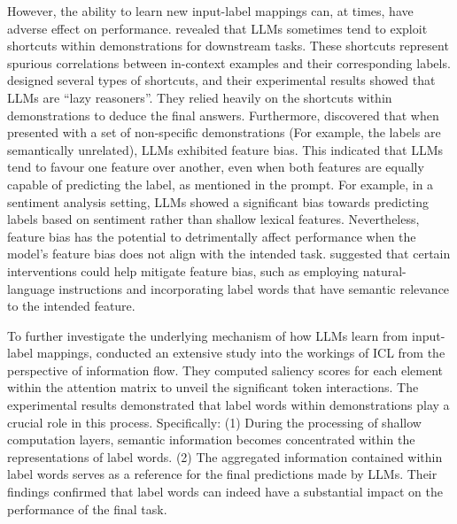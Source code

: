 However, the ability to learn new input-label mappings can, at times, have adverse effect on performance.
\citet{Tang2023LargeLM} revealed that LLMs sometimes tend to exploit shortcuts within demonstrations for downstream tasks.
These shortcuts represent spurious correlations between in-context examples and their corresponding labels.
\citet{Tang2023LargeLM} designed several types of shortcuts,  and their experimental results showed that LLMs are ``lazy reasoners''. 
They relied heavily on the shortcuts within demonstrations to deduce the final answers. 
Furthermore, \citet{Si2023MeasuringIB} discovered that when presented with a set of non-specific demonstrations (For example, the labels are semantically unrelated), LLMs exhibited feature bias. 
This indicated that LLMs tend to favour one feature over another, even when both features are equally capable of predicting the label, as mentioned in the prompt.
For example, in a sentiment analysis setting, LLMs showed a significant bias towards predicting labels based on sentiment rather than shallow lexical features.
Nevertheless, feature bias has the potential to detrimentally affect performance when the model's feature bias does not align with the intended task.
\citet{Si2023MeasuringIB} suggested that certain interventions could help mitigate feature bias, such as employing natural-language instructions and incorporating label words that have semantic relevance to the intended feature.

To further investigate the underlying mechanism of how LLMs learn from input-label mappings, \citet{Wang2023LabelWA} conducted an extensive study into the workings of ICL from the perspective of information flow.
They computed saliency scores for each element within the attention matrix to unveil the significant token interactions.
The experimental results demonstrated that label words within demonstrations play a crucial role in this process. Specifically:
(1) During the processing of shallow computation layers, semantic information becomes concentrated within the representations of label words.
(2) The aggregated information contained within label words serves as a reference for the final predictions made by LLMs.
Their findings confirmed that label words can indeed have a substantial impact on the performance of the final task.


